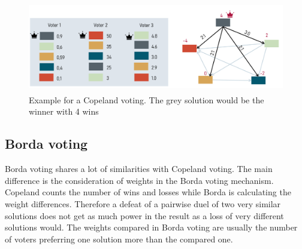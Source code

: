 \documentclass[german, a4paper, 11pt, oneside]{scrbook}
\begin{document}
\begin{figure}[h]
\centering
\includegraphics[height=4cm]{Copeland}
\caption{Example for a Copeland voting. The grey solution would be the winner with 4 wins}
\end{figure}
\subsection{Borda voting}
Borda voting shares a lot of similarities with Copeland voting. The main difference is the consideration of weights in the Borda voting mechanism. Copeland counts the number of wins and losses while Borda is calculating the weight differences. Therefore a defeat of a pairwise duel of two very similar solutions does not get as much power in the result as a loss of very different solutions would. The weights compared in Borda voting are usually the number of voters preferring one solution more than the compared one. 
\end{document}
